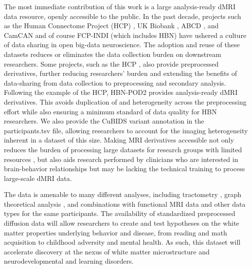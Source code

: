 \documentclass[9pt,lineno]{elife}
\begin{document}
The most immediate contribution of this work is a large analysis-ready dMRI
data resource, openly accessible to the public. In the past decade, projects such as
the Human Connectome Project (HCP) \citep{van-essen2013-oi}, UK Biobank
\citep{miller2016-mq}, ABCD \citep{jernigan2018-my}, and CamCAN
\citep{taylor2017-or,shafto2014-ld} and of course FCP-INDI (which includes HBN)
\citep{Mennes2013-dl} have ushered a culture of data sharing in open big-data
neuroscience. The adoption and reuse of these datasets reduces or eliminates the
data collection burden on downstream researchers. Some projects, such as the HCP
\citep{glasser2013-lo}, also provide preprocessed derivatives, further reducing
researchers' burden and extending the benefits of data-sharing from data
collection to preprocessing and secondary analysis. Following the example of the
HCP, HBN-POD2 provides analysis-ready dMRI derivatives. This avoids duplication
of and heterogeneity across the preprocessing effort while also ensuring a minimum standard of data quality
for HBN researchers.
We also provide the CuBIDS variant annotation in the participants.tsv file, allowing researchers to account for the imaging heterogeneity inherent in a dataset of this size.
Making MRI derivatives accessible not only reduces the burden of processing large datasets for research groups with limited resources \citep{laird2021large}, but also aids research performed by clinicians who are interested in brain-behavior relationships but may be lacking the technical training to process large-scale dMRI data.

The data is amenable to many different analyses, including
tractometry \citep{yeatman2012-rc, yeatman2018browser, kruper2021evaluating}, graph theoretical analysis \citep{yeh2020-nu},
and combinations with functional MRI data and other data types for the same
participants. The availability of standardized preprocessed diffusion data will
allow researchers to create and test hypotheses on the white matter properties
underlying behavior and disease, from reading and math acquisition to childhood
adversity and mental health. As such, this dataset will accelerate discovery at
the nexus of white matter microstructure and neurodevelopmental and learning
disorders.
\end{document}

